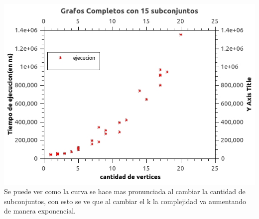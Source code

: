 \includegraphics[scale=0.5]{Ej2/k15.jpg}\\

Se puede ver como la curva se hace mas pronunciada al cambiar la cantidad de subconjuntos, con esto se ve que al cambiar el k la complejidad va aumentando de manera exponencial.

